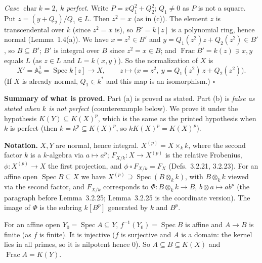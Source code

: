 \documentclass[11pt]{article}
\begin{document}
\emph{Case $\operatorname{char}k=2$, $k$ perfect.} Write $P=xQ_1^2+Q_2^2$; $Q_1\neq0$ as $P$ is not a square. Put $z=(y+Q_2)/Q_1\in L$. Then $z^2=x$ (as in (c)). The element $z$ is transcendental over $k$ (since $z^2=x$ is), so $B'=k[z]$ is a polynomial ring, hence normal (Lemma~1.4(a)). We have $x=z^2\in B'$ and $y=Q_1(z^2)z+Q_2(z^2)\in B'$, so $B\subseteq B'$; $B'$ is integral over $B$ since $z^2=x\in B$; and $\operatorname{Frac}B'=k(z)\ni x,y$ equals $L$ (as $z\in L$ and $L=k(x,y)$). So the normalization of $X$ is
\[ X'=\mathbb A^1_k=\operatorname{Spec}k[z]\longrightarrow X,\qquad z\mapsto\bigl(x=z^2,\ y=Q_1(z^2)\,z+Q_2(z^2)\bigr). \]
(If $X$ is already normal, $Q_1\in k^*$ and this map is an isomorphism.) \hfill$\square$

\pf
\textbf{Summary of what is proved.} Part (a) is proved as stated. Part (b) is \emph{false as stated when $k$ is not perfect} (counterexample below). We prove it under the hypothesis $K(Y)\subseteq K(X)^p$, which is the same as the printed hypothesis when $k$ is perfect (then $k=k^p\subseteq K(X)^p$, so $kK(X)^p=K(X)^p$).

\textbf{Notation.} $X,Y$ are normal, hence integral. $X^{(p)}=X\times_kk$, where the second factor $k$ is a $k$-algebra via $a\mapsto a^p$; $F_{X/k}:X\to X^{(p)}$ is the relative Frobenius, $\phi:X^{(p)}\to X$ the first projection, and $\phi\circ F_{X/k}=F_X$ (Defs.~3.2.21, 3.2.23). For an affine open $\operatorname{Spec}B\subseteq X$ we have $X^{(p)}\supseteq\operatorname{Spec}(B\otimes_kk)$, with $B\otimes_kk$ viewed via the second factor, and $F_{X/k}$ corresponds to $\Phi:B\otimes_kk\to B$, $b\otimes a\mapsto ab^p$ (the paragraph before Lemma~3.2.25; Lemma~3.2.25 is the coordinate version). The image of $\Phi$ is the subring $k[B^p]$ generated by $k$ and $B^p$.

For an affine open $Y_0=\operatorname{Spec}A\subseteq Y$, $f^{-1}(Y_0)=\operatorname{Spec}B$ is affine and $A\to B$ is finite (as $f$ is finite). It is injective ($f$ is surjective and $A$ is a domain: the kernel lies in all primes, so it is nilpotent hence $0$). So $A\subseteq B\subseteq K(X)$ and $\operatorname{Frac}A=K(Y)$.
\end{document}
